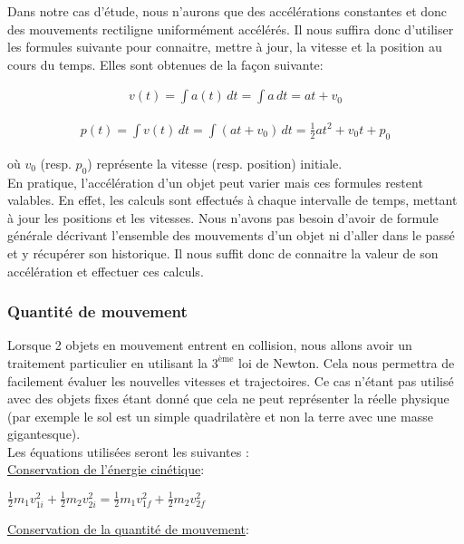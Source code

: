 Dans notre cas d'étude, nous n'aurons que des accélérations constantes et donc des mouvements rectiligne uniformément accélérés. Il nous suffira donc d'utiliser les formules suivante pour connaitre, mettre à jour, la vitesse et la position au cours du temps. Elles sont obtenues de la façon suivante:


\begin{align*}
	v(t) = \int a(t) \, dt = \int a \, dt = at + v_0
\end{align*}

\begin{align*}
	p(t) = \int v(t) \, dt =\int (at + v_0) \, dt = \frac{1}{2}at^2 + v_0t + p_0
\end{align*}

où $v_0$ (resp. $p_0$) représente la vitesse (resp. position) initiale.\\

En pratique, l'accélération d'un objet peut varier mais ces formules restent valables. En effet, les calculs sont effectués à chaque intervalle de temps, mettant à jour les positions et les vitesses. Nous n'avons pas besoin d'avoir de formule générale décrivant l'ensemble des mouvements d'un objet ni d'aller dans le passé et y récupérer son historique. Il nous suffit donc de connaitre la valeur de son accélération et effectuer ces calculs.

\subsubsection{Quantité de mouvement}
Lorsque 2 objets en mouvement entrent en collision, nous allons avoir un traitement particulier en utilisant la $3^{\text{ème}}$ loi de Newton. Cela nous permettra de facilement évaluer les nouvelles vitesses et trajectoires. Ce cas n'étant pas utilisé avec des objets fixes étant donné que cela ne peut représenter la réelle physique (par exemple le sol est un simple quadrilatère et non la terre avec une masse gigantesque).\\
\noindent Les équations utilisées seront les suivantes \citep{force}:\\

\noindent\underline{Conservation de l'énergie cinétique}:\\

\centerline{$\frac{1}{2}m_1v_{1i}^2 + \frac{1}{2}m_2v_{2i}^2 = \frac{1}{2}m_1v_{1f}^2 + \frac{1}{2}m_2v_{2f}^2$}

\noindent\underline{Conservation de la quantité de mouvement}: \\

